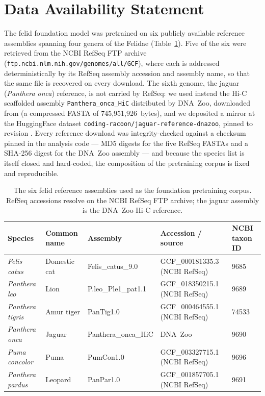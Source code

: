 \documentclass[twocolumn,10pt]{article}
\begin{document}
\section*{Data Availability Statement}
The felid foundation model was pretrained on six publicly available reference assemblies spanning
four genera of the Felidae (Table~\ref{tab:assemblies}). Five of the six were retrieved from the
NCBI RefSeq FTP archive (\texttt{ftp.ncbi.nlm.nih.gov/genomes/all/GCF}), where each is addressed
deterministically by its RefSeq assembly accession and assembly name, so that the same file is
recovered on every download. The sixth genome, the jaguar (\textit{Panthera onca}) reference, is not
carried by RefSeq: we used instead the Hi-C scaffolded assembly \texttt{Panthera\_onca\_HiC}
distributed by DNA~Zoo, downloaded from
\texttt{} (a
compressed FASTA of 745{,}951{,}926~bytes), and we deposited a mirror at the HuggingFace dataset
\texttt{coding-racoon/jaguar-reference-dnazoo}, pinned to revision
\texttt{}. Every reference download was
integrity-checked against a checksum pinned in the analysis code --- MD5 digests for the five RefSeq
FASTAs and a SHA-256 digest for the DNA~Zoo assembly --- and because the species list is itself
closed and hard-coded, the composition of the pretraining corpus is fixed and reproducible.

\begin{table}[t]
\centering
\caption{The six felid reference assemblies used as the foundation pretraining corpus. RefSeq
accessions resolve on the NCBI RefSeq FTP archive; the jaguar assembly is the DNA~Zoo Hi-C
reference.}
\label{tab:assemblies}
\begin{tabular}{@{}lllll@{}}
\toprule
Species & Common name & Assembly & Accession / source & NCBI taxon ID \\
\midrule
\textit{Felis catus} & Domestic cat & Felis\_catus\_9.0 & GCF\_000181335.3 (NCBI RefSeq) & 9685 \\
\textit{Panthera leo} & Lion & P.leo\_Ple1\_pat1.1 & GCF\_018350215.1 (NCBI RefSeq) & 9689 \\
\textit{Panthera tigris} & Amur tiger & PanTig1.0 & GCF\_000464555.1 (NCBI RefSeq) & 74533 \\
\textit{Panthera onca} & Jaguar & Panthera\_onca\_HiC & DNA~Zoo & 9690 \\
\textit{Puma concolor} & Puma & PumCon1.0 & GCF\_003327715.1 (NCBI RefSeq) & 9696 \\
\textit{Panthera pardus} & Leopard & PanPar1.0 & GCF\_001857705.1 (NCBI RefSeq) & 9691 \\
\bottomrule
\end{tabular}
\end{table}
\end{document}

